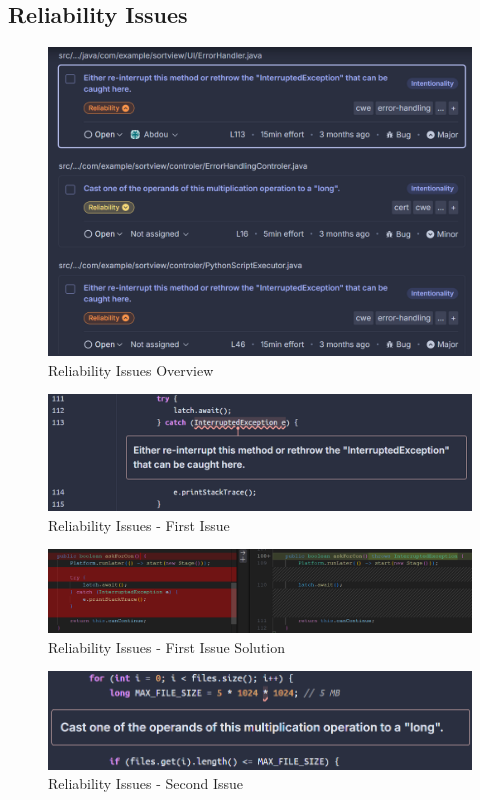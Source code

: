 \documentclass[12pt,a4paper]{article}
\begin{document}
\subsection{Reliability Issues}
\begin{figure}[H]
    \centering
    \includegraphics[width=1\textwidth]{Reliability Issues-3I.png}
    \caption{Reliability Issues Overview}
    \label{fig:3I}
\end{figure}
\begin{figure}[H]
    \centering
    \includegraphics[width=1\textwidth]{Reliability Issues-1st.png}
    \caption{Reliability Issues - First Issue}
    \label{fig:1st}
\end{figure}
\begin{figure}[H]
    \centering
    \includegraphics[width=1\textwidth]{Reliability Issues-1stS.png}
    \caption{Reliability Issues - First Issue Solution}
    \label{fig:1stS}
\end{figure}
\begin{figure}[H]
    \centering
    \includegraphics[width=1\textwidth]{Reliability Issues-2nd.png}
    \caption{Reliability Issues - Second Issue}
    \label{fig:2nd}
\end{figure}
\end{document}

